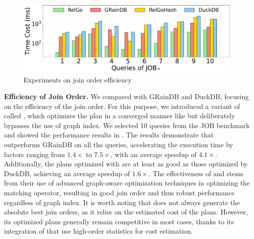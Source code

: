 \begin{figure}[t]
    \centering
    \includegraphics[width=.9\linewidth]{./figures/exp/hash_plan_job.pdf}
    \vspace{-0.5em}
    \caption{Experiments on join order efficiency}
    \label{fig:exp-hash-plan}
    \vspace{-1.2em}
\end{figure}

\noindent\textbf{Efficiency of Join Order.}
We compared \name with GRainDB and DuckDB, focusing on the efficiency of the join order. For this purpose, we introduced a variant of \name called \relgohash, which optimizes the plan in a converged manner like \name but deliberately bypasses the use of graph index. We selected 10 queries from the JOB benchmark and showed the performance results in .
The results demonstrate that \name outperforms GRainDB on all the queries, accelerating the execution time by factors ranging from $1.4\times$ to $7.5\times$, with an average speedup of $4.1\times$. Additionally, the plans optimized with \relgohash are at least as good as those optimized by DuckDB, achieving an average speedup of $1.6\times$. The effectiveness of \name and \relgohash stems from their use of advanced graph-aware optimization techniques in optimizing the matching operator, resulting in good join order and thus robust performance regardless of graph index.
It is worth noting that \name does not always generate the absolute best join orders, as it relies on the estimated cost of the plans. However, its optimized plans generally remain competitive in most cases, thanks to its integration of \glogue that use high-order statistics for cost estimation.



